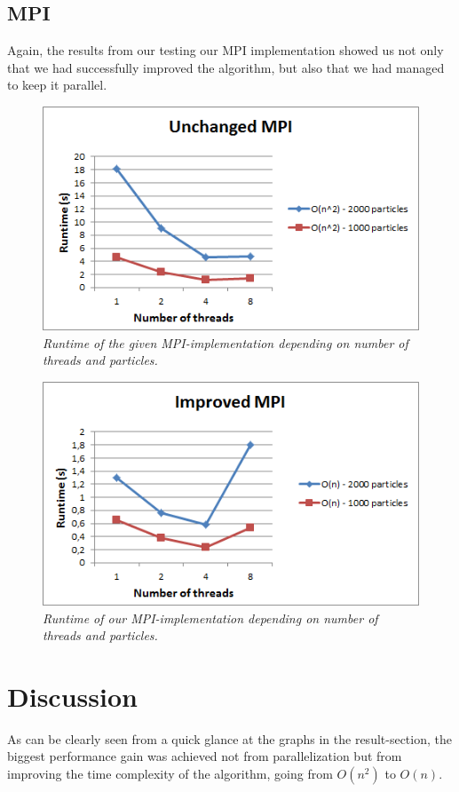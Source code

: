 \documentclass[11pt,a4paper]{article}
\begin{document}
\subsection{MPI}
Again, the results from our testing our MPI implementation showed us not only that we had successfully improved the algorithm, but also that we had managed to keep it parallel.
\begin{figure}[h!]
\centering
\includegraphics[scale=0.8]{pics/mpi1.png}
\caption{\emph{Runtime of the given MPI-implementation depending on number of threads and particles.}}
\label{fig:gird}
\end{figure}

\begin{figure}[htb]
\centering
\includegraphics[scale=0.8]{pics/mpi2.png}
\caption{\emph{Runtime of our MPI-implementation depending on number of threads and particles.}}
\label{fig:gird}
\end{figure}

\newpage
\section{Discussion}
As can be clearly seen from a quick glance at the graphs in the result-section, the biggest performance gain was achieved not from parallelization but from improving the time complexity of the algorithm, going from $O(n^{2})$ to $O(n)$. 
\end{document}
